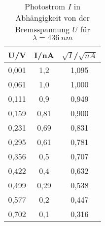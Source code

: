 \begin{table}[h!]
  \centering
  \caption{Photostrom $I$ in Abhängigkeit von der Bremsspannung $U$ für $\lambda=\SI{436}{nm}$}
  \label{tab:v436}
  \begin{tabular}{c c c}
    \toprule
      U/V & I/nA  & $\sqrt{I}$/$\sqrt{nA}$ \\
    \midrule
      0,001 & 1,2  & 1,095 \\
      0,061 & 1,0  & 1,000 \\
      0,111 & 0,9  & 0,949 \\
      0,159 & 0,81 & 0,900 \\
      0,231 & 0,69 & 0,831 \\
      0,295 & 0,61 & 0,781 \\
      0,356 & 0,5  & 0,707 \\
      0,422 & 0,4  & 0,632 \\
      0,499 & 0,29 & 0,538 \\
      0,577 & 0,2  & 0,447 \\
      0,702 & 0,1  & 0,316 \\

    \bottomrule
  \end{tabular}
\end{table}
